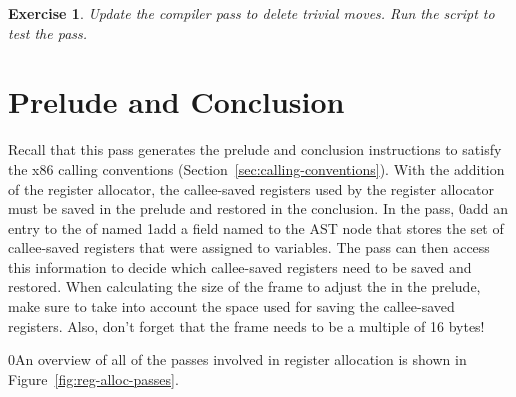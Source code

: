 \documentclass[7x10,nocrop]{TimesAPriori_MIT}%
\def\racketEd{0}
\def\pythonEd{1}
\def\edition{1}
\newcommand{\racket}[1]{{\if\edition\racketEd{#1}\fi}}
\newcommand{\python}[1]{{\if\edition\pythonEd #1\fi}}
\newtheorem{exercise}[theorem]{Exercise}
\begin{document}
\begin{exercise}\normalfont
%
Update the  compiler pass to delete trivial moves.
%
%
Run the script to test the  pass.
\end{exercise}


\section{Prelude and Conclusion}
\label{sec:print-x86-reg-alloc}

Recall that this pass generates the prelude and conclusion
instructions to satisfy the x86 calling conventions
(Section~\ref{sec:calling-conventions}). With the addition of the
register allocator, the callee-saved registers used by the register
allocator must be saved in the prelude and restored in the conclusion.
In the  pass,
%
\racket{add an entry to the 
  of  named }
%
\python{add a field named \code{used\_callee} to the \code{X86Program} AST node}
%
that stores the set of callee-saved registers that were assigned to
variables. The  pass can then access
this information to decide which callee-saved registers need to be
saved and restored.
%
When calculating the size of the frame to adjust the  in the
prelude, make sure to take into account the space used for saving the
callee-saved registers. Also, don't forget that the frame needs to be
a multiple of 16 bytes!

\racket{An overview of all of the passes involved in register
  allocation is shown in Figure~\ref{fig:reg-alloc-passes}.}
\end{document}
